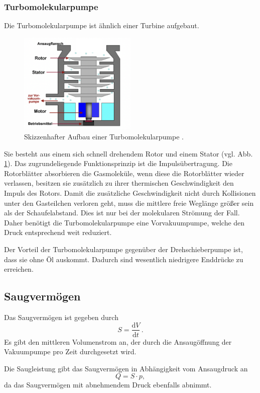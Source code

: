 \subsubsection{Turbomolekularpumpe}
Die Turbomolekularpumpe ist ähnlich einer Turbine aufgebaut.
\begin{figure}[h]
    \centering
    \includegraphics[width=0.5\textwidth]{abb/Turbopumpe.png}
    \caption{Skizzenhafter Aufbau einer Turbomolekularpumpe \cite{turbo}.}
    \label{fig:turbo0}
\end{figure}
Sie besteht aus einem sich schnell drehendem Rotor und einem Stator (vgl. Abb. \ref{fig:turbo0}).
Das zugrundeliegende Funktionsprinzip ist die Impulsübertragung.
Die Rotorblätter absorbieren die Gasmoleküle, 
wenn diese die Rotorblätter wieder verlassen, besitzen sie zusätzlich zu ihrer thermischen Geschwindigkeit den Impuls des Rotors.
Damit die zusätzliche Geschwindigkeit nicht durch Kollisionen unter den Gasteilchen verloren geht,
muss die mittlere freie Weglänge größer sein als der Schaufelabstand.
Dies ist nur bei der molekularen Strömung der Fall.
Daher benötigt die Turbomolekularpumpe eine Vorvakuumpumpe,
welche den Druck entsprechend weit reduziert.

Der Vorteil der Turbomolekularpumpe gegenüber der Drehschieberpumpe ist,
dass sie ohne Öl auskommt.
Dadurch sind wesentlich niedrigere Enddrücke zu erreichen.


\subsection{Saugvermögen}
Das Saugvermögen ist gegeben durch 
\begin{equation}
    S =\frac{\text{d}V}{\text{d}t}\, .
\end{equation}
Es gibt den mittleren Volumenstrom an,
der durch die Ansaugöffnung der Vakuumpumpe pro Zeit durchgesetzt wird.

Die Saugleistung gibt das Saugvermögen in Abhängigkeit vom Ansaugdruck an
\begin{equation}
    Q = S\cdot p,
    \label{eq:leckQ}
\end{equation}
da das Saugvermögen mit abnehmendem Druck ebenfalls abnimmt.

